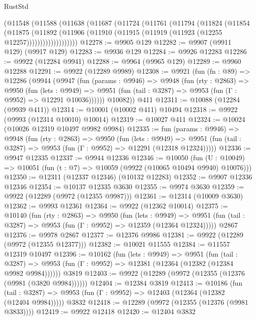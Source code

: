 \begin{lexlean}{RustStd}
\begin{coremodule}
        (@11548
          (@11588
            (@11638
              (@11687
                (@11724
                  (@11761
                    (@11794
                      (@11824
                        (@11854
                          (@11875
                            (@11892
                              (@11906
                                (@11910 (@11915 (@11919 (@11923 (@12255 @12257)))))))))))))))))))
@12278 := @9905 @129
@12282 := @9907 (@9911 @129) (@9917 @129)
@12283 := @9936 @129
@12284 := @9926 @12283
@12286 := @9922 (@12284 @9941)
@12288 := @9964 (@9965 @129)
@12289 := @9960 @12288
@12291 := @9922 (@12289 @9989)
@12308 := @9921
    (fun (fn : @89) =>
    @12286
      (@9944
        (@9947
          (fun (params : @9946) =>
          @9948
            (fun (rty : @2863) =>
            @9950
              (fun (lets : @9949) =>
              @9951 (fun (tail : @3287) => @9953 (fun (Γ : @9952) => @12291 @10036))))))
        @10082))
    @411
@12311 := @10088 (@12284 (@9939 @411))
@12314 := @10001 (@10002 @411) @10494
@12318 := @9922 (@9993 (@12314 @10010) @10014)
@12319 := @10027 @411
@12324 := @10024 (@10026 @12319 @10497 @9982 @9984)
@12335 := fun (params : @9946) =>
  @9948
    (fun (rty : @2863) =>
    @9950
      (fun (lets : @9949) =>
      @9951 (fun (tail : @3287) => @9953 (fun (Γ : @9952) => @12291 (@12318 @12324)))))
@12336 := @9947 @12335
@12337 := @9944 @12336
@12346 := @10050
    (fun (U : @10049) => @10051 (fun (t : @7) => @10059 (@9922 (@10065 @10494 @9940) @10076)))
@12350 := @12311 (@12337 @12346) (@10132 @12283)
@12352 := @9907 @12336 @12346
@12354 := @10137 @12335 @3630
@12355 := @9974 @3630
@12359 := @9922 (@12289 (@9972 (@12355 @9987)))
@12361 := @12314 (@10009 @3630)
@12362 := @9993 @12361
@12364 := @9922 (@12362 @10014)
@12375 := @10140
    (fun (rty : @2863) =>
    @9950
      (fun (lets : @9949) =>
      @9951 (fun (tail : @3287) => @9953 (fun (Γ : @9952) => @12359 (@12364 @12324)))))
    @2867
@12376 := @9978 @2867
@12377 := @12376 @9986
@12381 := @9922 (@12289 (@9972 (@12355 @12377)))
@12382 := @10021 @11555
@12384 := @11557 @12319 @10497
@12396 := @10162
    (fun (lets : @9949) =>
    @9951
      (fun (tail : @3287) =>
      @9953 (fun (Γ : @9952) => @12381 (@12364 (@12382 (@12384 @9982 @9984))))))
    @3819
@12403 := @9922 (@12289 (@9972 (@12355 (@12376 (@9981 (@3820 @9984))))))
@12404 := @12384 @3819
@12413 := @10186
    (fun (tail : @3287) => @9953 (fun (Γ : @9952) => @12403 (@12364 (@12382 (@12404 @9984)))))
    @3832
@12418 := @12289 (@9972 (@12355 (@12376 (@9981 @3833))))
@12419 := @9922 @12418
@12420 := @12404 @3832

\end{coremodule}
\end{lexlean}
